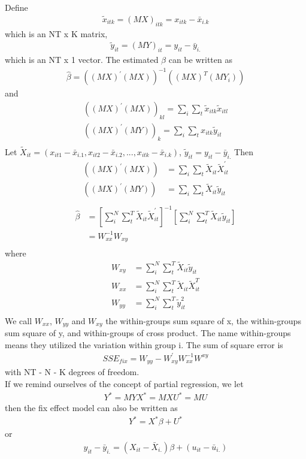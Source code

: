 \documentclass[a4paper]{article}
\begin{document}
Define  
\begin{align*}
\tilde x_{itk} = (MX)_{itk} =x_{itk} - \bar x_{i.k}
\end{align*}
which is an NT x K matrix,
\begin{align*}
\tilde y_{it} = (MY)_{it} = y_{it} - \bar y_{i.}
\end{align*}
which is an NT x 1 vector.
The estimated $\beta$ can be written as
\begin{align*}
\hat \beta  = ((MX)^{'}(MX))^{-1}((MX)^T(MY_i)) 
\end{align*}
and
\begin{align*}
((MX)^{'}(MX))_{kl} = \sum_i \sum_t \tilde x_{itk}  \tilde x_{itl} \\
((MX)^{'}(MY))_k = \sum_i \sum_t x_{itk} \tilde y_{it} \\
\end{align*}
Let $\tilde X_{it} = (x_{it1} - \bar x_{i.1}, x_{it2} - \bar x_{i.2},...,x_{itk} - \bar x_{i.k})$, $\tilde y_{it} = y_{it} - \bar y_{i.}$
Then 
\begin{align*}
((MX)^{'}(MX)) &= \sum_i \sum_t \tilde X_{it} \tilde X_{it}^{'}\\
((MX)^{'}(MY)) &= \sum_i \sum_t \tilde X_{it} \tilde y_{it} \\
\end{align*}
\begin{align*}
\hat \beta & =[\sum_i^N\sum_t^T\tilde X_{it}\tilde X_{it}^{'}]^{-1}[\sum_i^N\sum_t^T\tilde X_{it} \tilde y_{it}] \\
               & = W_{xx}^{-1}W_{xy}\\
\end{align*}
where 
\begin{align*}
W_{xy} &= \sum_i^N\sum_t^T \tilde X_{it} \tilde y_{it} \\
W_{xx} &= \sum_i^N\sum_t^T\tilde X_{it}\tilde X_{it}^T\\
W_{yy} &= \sum_i^N\sum_t^T\tilde y_{it}^2\\
\end{align*}
We call $W_{xx}$, $W_{yy}$ and $W_{xy}$ the within-groups sum square of x, the within-groups sum square of y, and within-groups of cross product. The name within-groups means they utilized the variation within group i. The sum of square error is
\begin{align*}
SSE_{fix} = W_{yy} - W^{'}_{xy}W^{-1}_{xx}W^{xy}
\end{align*}
with NT - N - K degrees of freedom.\\
If we remind ourselves of the concept of partial regression, we let
\begin{align*}
Y^{*} = MY
X^{*} = MX
U^{*} = MU
\end{align*}
then the fix effect model can also be written as
\begin{align*}
Y^{*} = X^{*}\beta + U^{*}
\end{align*}
or 
\begin{align*}
y_{it} - \bar y_{i.} = (X_{it} - \bar X_{i.}) \beta +  (u_{it} - \bar u_{i.})
\end{align*} 
\end{document}
